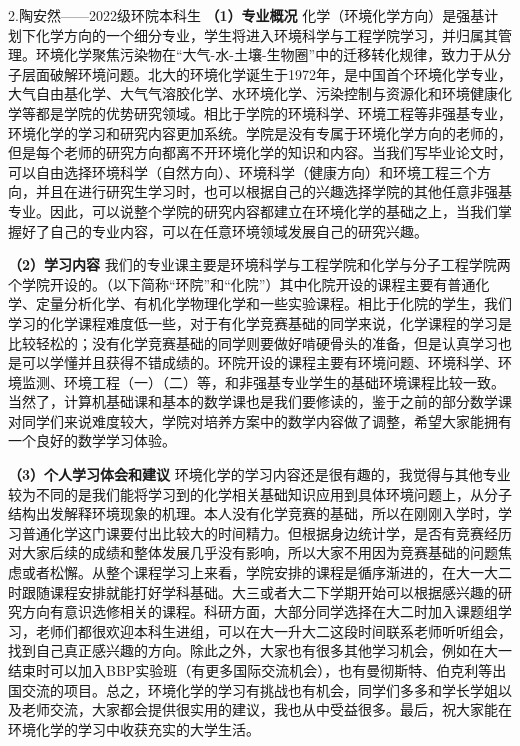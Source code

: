 \documentclass[11pt,oneside]{book}
\begin{document}
2.陶安然——2022级环院本科生
\textbf{（1）专业概况}
化学（环境化学方向）是强基计划下化学方向的一个细分专业，学生将进入环境科学与工程学院学习，并归属其管理。环境化学聚焦污染物在“大气-水-土壤-生物圈”中的迁移转化规律，致力于从分子层面破解环境问题。北大的环境化学诞生于1972年，是中国首个环境化学专业，大气自由基化学、大气气溶胶化学、水环境化学、污染控制与资源化和环境健康化学等都是学院的优势研究领域。相比于学院的环境科学、环境工程等非强基专业，环境化学的学习和研究内容更加系统。学院是没有专属于环境化学方向的老师的，但是每个老师的研究方向都离不开环境化学的知识和内容。当我们写毕业论文时，可以自由选择环境科学（自然方向）、环境科学（健康方向）和环境工程三个方向，并且在进行研究生学习时，也可以根据自己的兴趣选择学院的其他任意非强基专业。因此，可以说整个学院的研究内容都建立在环境化学的基础之上，当我们掌握好了自己的专业内容，可以在任意环境领域发展自己的研究兴趣。

\textbf{（2）学习内容}
我们的专业课主要是环境科学与工程学院和化学与分子工程学院两个学院开设的。（以下简称“环院”和“化院”）其中化院开设的课程主要有普通化学、定量分析化学、有机化学物理化学和一些实验课程。相比于化院的学生，我们学习的化学课程难度低一些，对于有化学竞赛基础的同学来说，化学课程的学习是比较轻松的；没有化学竞赛基础的同学则要做好啃硬骨头的准备，但是认真学习也是可以学懂并且获得不错成绩的。环院开设的课程主要有环境问题、环境科学、环境监测、环境工程（一）（二）等，和非强基专业学生的基础环境课程比较一致。当然了，计算机基础课和基本的数学课也是我们要修读的，鉴于之前的部分数学课对同学们来说难度较大，学院对培养方案中的数学内容做了调整，希望大家能拥有一个良好的数学学习体验。

\textbf{（3）个人学习体会和建议}
环境化学的学习内容还是很有趣的，我觉得与其他专业较为不同的是我们能将学习到的化学相关基础知识应用到具体环境问题上，从分子结构出发解释环境现象的机理。本人没有化学竞赛的基础，所以在刚刚入学时，学习普通化学这门课要付出比较大的时间精力。但根据身边统计学，是否有竞赛经历对大家后续的成绩和整体发展几乎没有影响，所以大家不用因为竞赛基础的问题焦虑或者松懈。从整个课程学习上来看，学院安排的课程是循序渐进的，在大一大二时跟随课程安排就能打好学科基础。大三或者大二下学期开始可以根据感兴趣的研究方向有意识选修相关的课程。科研方面，大部分同学选择在大二时加入课题组学习，老师们都很欢迎本科生进组，可以在大一升大二这段时间联系老师听听组会，找到自己真正感兴趣的方向。除此之外，大家也有很多其他学习机会，例如在大一结束时可以加入BBP实验班（有更多国际交流机会），也有曼彻斯特、伯克利等出国交流的项目。总之，环境化学的学习有挑战也有机会，同学们多多和学长学姐以及老师交流，大家都会提供很实用的建议，我也从中受益很多。最后，祝大家能在环境化学的学习中收获充实的大学生活。
\end{document}
